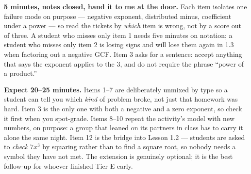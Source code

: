 \documentclass[10pt]{article}
\begin{document}
\begin{teachernote}
    \textbf{5 minutes, notes closed, hand it to me at the door.} Each item isolates one failure
    mode on purpose --- negative exponent, distributed minus, coefficient under a power --- so
    read the tickets by \emph{which} item is wrong, not by a score out of three. A student who
    misses only item 1 needs five minutes on notation; a student who misses only item 2 is losing
    signs and will lose them again in 1.3 when factoring out a negative GCF. Item 3 asks for a
    sentence: accept anything that says the exponent applies to the $3$, and do not require the
    phrase ``power of a product.''
\end{teachernote}

\begin{teachernote}[Homework]
    \textbf{Expect 20--25 minutes.} Items 1--7 are deliberately unmixed by type so a student can
    tell you which \emph{kind} of problem broke, not just that homework was hard. Item 3 is the
    only one with both a negative and a zero exponent, so check it first when you spot-grade.
    Items 8--10 repeat the activity's model with new numbers, on purpose: a group that leaned on
    its partners in class has to carry it alone the same night. Item 12 is the bridge into Lesson
    1.2 --- students are asked to \emph{check} $7x^3$ by squaring rather than to find a square
    root, so nobody needs a symbol they have not met. The extension is genuinely optional; it is
    the best follow-up for whoever finished Tier E early.
\end{teachernote}
\end{document}
